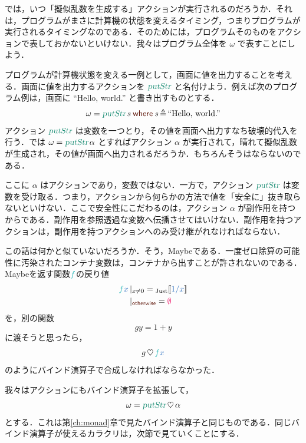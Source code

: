 \documentclass[a5paper,twoside,fleqn,draft]{jsbook}
\def\[{[\![}
\def\]{]\!]}
\def\constantColor{WildStrawberry}
\def\keywordColor{Sepia}
\def\varColor{NavyBlue}
\def\funcColor{BlueGreen}
\def\actionColor{PineGreen}
\newcommand{\mKeyword}[1]{\textcolor{\keywordColor}{\mathsf{#1}}}
\newcommand{\mOtherwiseKeyword}{\mKeyword{otherwise}}
\newcommand{\mWhereKeyword}{\mKeyword{where}}
\DeclareMathOperator{\mOtherwise}{\mOtherwiseKeyword}
\newcommand{\mNothing}{\textcolor{\constantColor}{\emptyset}}
\newcommand{\mString}[1]{\text{#1}}
\newcommand{\mVar}[1]{\textcolor{\varColor}{#1}}
\newcommand{\mXVar}{\mVar{x}}
\newcommand{\mFunc}[1]{\textcolor{\funcColor}{#1}}
\newcommand{\mFFunc}{{\mFunc{f}}}
\newcommand{\mActionLong}[1]{\textcolor{\actionColor}{\textsl{#1}}}
\DeclareMathOperator{\mPutStr}{\mActionLong{putStr}}
\DeclareMathOperator{\mBind}{\heartsuit}
\DeclareMathOperator{\mLetEq}{\triangleq}
\newcommand{\mValueConstructor}[1]{\mathrm{#1}}
\newcommand{\mValueWith}[2]{{}_\mValueConstructor{#1}\[\mVar{#2}\]}
\newcommand{\mJustWith}[1]{\mValueWith{Just}{#1}}
\newcommand{\mGuard}[1]{\mathop{\mid_{#1}}}
\newcommand{\mWhereIsEXP}[2]{\mathbin{\mWhereKeyword}#1\mLetEq#2} %
\begin{document}
では，いつ「擬似乱数を生成する」アクションが実行されるのだろうか．それは，プログラムがまさに計算機の状態を変えるタイミング，つまりプログラムが実行されるタイミングなのである．そのためには，プログラムそのものをアクションで表しておかないといけない．我々はプログラム全体を $\omega$ で表すことにしよう．

プログラムが計算機状態を変える一例として，画面に値を出力することを考える．画面に値を出力するアクションを $\mPutStr$ と名付けよう．例えば次のプログラム例は，画面に ``Hello, world.'' と書き出すものとする．
\begin{equation}
\omega=\mPutStr s\mWhereIsEXP{s}{\mString{``Hello, world.''}}
\end{equation}
アクション $\mPutStr$ は変数を一つとり，その値を画面へ出力すなち破壊的代入を行う．では $\omega=\mPutStr\alpha$ とすればアクション $\alpha$ が実行されて，晴れて擬似乱数が生成され，その値が画面へ出力されるだろうか．もちろんそうはならないのである．

ここに $\alpha$ はアクションであり，変数ではない．一方で，アクション $\mPutStr$ は変数を受け取る．つまり，アクションから何らかの方法で値を「安全に」抜き取らないといけない．ここで安全性にこだわるのは，アクション $\alpha$ が副作用を持つからである．副作用を参照透過な変数へ伝播させてはいけない．副作用を持つアクションは，副作用を持つアクションへのみ受け継がれなければならない．

この話は何かと似ていないだろうか．そう，Maybeである．一度ゼロ除算の可能性に汚染されたコンテナ変数は，コンテナから出すことが許されないのである．Maybeを返す関数$\mFFunc$の戻り値
\begin{equation}
  \begin{aligned}
    \mFFunc\mXVar&\mGuard{x\neq0}=\mJustWith{1/x}\\
    &\mGuard{\mOtherwise}=\mNothing
  \end{aligned}
\end{equation}
を，別の関数
\begin{equation}
  gy=1+y
\end{equation}
に渡そうと思ったら，
\begin{equation}
  g\mBind \mFFunc\mXVar
\end{equation}
のようにバインド演算子で合成しなければならなかった．

我々はアクションにもバインド演算子を拡張して，
\begin{equation}
  \omega=\mPutStr\mBind\alpha
\end{equation}
とする．これは第\ref{ch:monad}章で見たバインド演算子と同じものである．同じバインド演算子が使えるカラクリは，次節で見ていくことにする．
\end{document}
